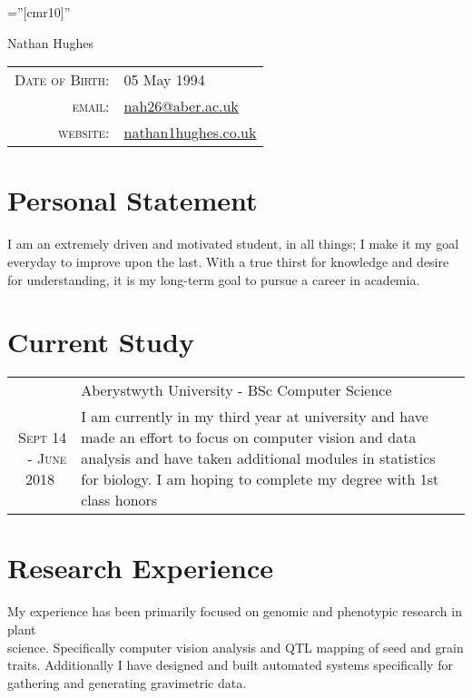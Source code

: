 \documentclass[a4paper,9pt]{article}
\begin{document}
\pagestyle{empty} %

\font\fb=''[cmr10]'' %

\par{\centering
  {\Huge Nathan {Hughes}
  }\bigskip\par}


\begin{center}
  \begin{tabular}{rl}
    \textsc{Date of Birth:} & 05 		May 1994 \\
    \textsc{email:}     & \href{mailto:nah26@aber.ac.uk}{nah26@aber.ac.uk}\\
    \textsc{website:}  & \href{nathan1hughes.co.uk}{nathan1hughes.co.uk}       
  \end{tabular}
\end{center}


\section{Personal Statement}
I am an extremely driven and motivated student, in all things; I make it my goal everyday to improve upon the last. With a true thirst for knowledge and desire for understanding, it is my long-term goal to pursue a career in academia.
\section{Current Study}


\begin{tabular}{rp{11cm}}
  &Aberystwyth University - BSc Computer Science\\\textsc{Sept 14 - June 2018 \  }&\footnotesize{I am currently in my third year at university and have made an effort to focus on computer vision and data analysis and have taken additional modules in statistics for biology. I am hoping to complete my degree with 1st class honors}
 \end{tabular}

\section{Research Experience}
My experience has been primarily focused on genomic and phenotypic research in plant \\science. Specifically computer vision analysis and QTL mapping of seed and grain traits. Additionally I have designed and built automated systems specifically for gathering and generating gravimetric data.
\end{document}
